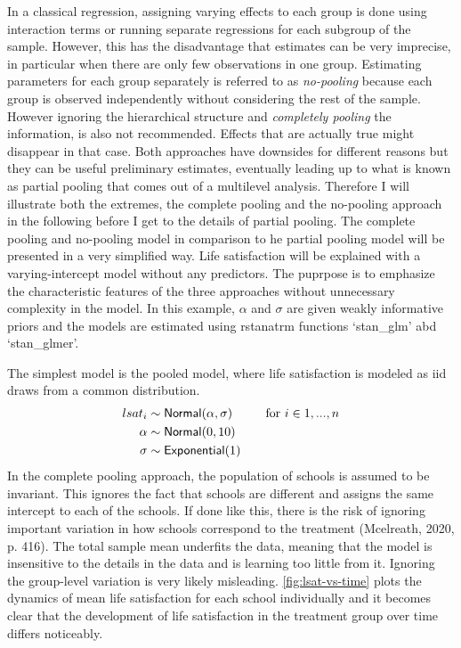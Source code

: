 \documentclass[a4, 12pt]{article}
\begin{document}
In a classical regression, assigning varying effects to each group is done using interaction terms or running separate regressions for each subgroup of the sample. However, this has the disadvantage that estimates can be very imprecise, in particular when there are only few observations in one group. Estimating parameters for each group separately is referred to as \emph{no-pooling} because each group is observed independently without considering the rest of the sample. However ignoring the hierarchical structure and \emph{completely pooling} the information, is also not recommended. Effects that are actually true might disappear in that case. Both approaches have downsides for different reasons but they can be useful preliminary estimates, eventually leading up to what is known as partial pooling that comes out of a multilevel analysis. Therefore I will illustrate both the extremes, the complete pooling and the no-pooling approach in the following before I get to the details of partial pooling. The complete pooling and no-pooling model in comparison to he partial pooling model will be presented in a very simplified way. Life satisfaction will be explained with a varying-intercept model without any predictors. The puprpose is to emphasize the characteristic features of the three approaches without unnecessary complexity in the model. In this example, \(\alpha\) and \(\sigma\) are given weakly informative priors and the models are estimated using rstanatrm functions `stan\_glm' abd `stan\_glmer'.

The simplest model is the pooled model, where life satisfaction is modeled as iid draws from a common distribution.
\begin{align*}
lsat_i & \sim {\sf Normal} (\alpha, \sigma) & \quad \text{for } i \in 1,...,n \\
\alpha & \sim {\sf Normal} (0, 10) \\
\sigma & \sim {\sf Exponential} (1)
\end{align*}
In the complete pooling approach, the population of schools is assumed to be invariant. This ignores the fact that schools are different and assigns the same intercept to each of the schools. If done like this, there is the risk of ignoring important variation in how schools correspond to the treatment (Mcelreath, 2020, p. 416). The total sample mean underfits the data, meaning that the model is insensitive to the details in the data and is learning too little from it. Ignoring the group-level variation is very likely misleading. \ref{fig:lsat-vs-time} plots the dynamics of mean life satisfaction for each school individually and it becomes clear that the development of life satisfaction in the treatment group over time differs noticeably.
\end{document}
